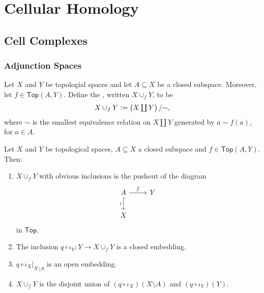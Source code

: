 \chapter{Cellular Homology}
\section*{Cell Complexes}
\subsection*{Adjunction Spaces}

\begin{definition}
	Let $X$ and $Y$ be topologial spaces and let $A \subseteq X$ be a closed subspace. Moreover, let $f \in \mathsf{Top}(A,Y)$. Define the , written $X \cup_f Y$, to be
	\begin{equation*}
		X \cup_f Y := \textstyle\del[1]{X \coprod Y}/{\sim},
	\end{equation*}
	\noindent where $\sim$ is the smallest equivalence relation on $X \coprod Y$ generated by $a {\sim} f(a)$, for $a \in A$.
\end{definition}

\begin{lemma}
	Let $X$ and $Y$ be topological spaces, $A \subseteq X$ a closed subspace and $f \in \mathsf{Top}(A,Y)$. Then:
	\begin{enumerate}[label = \textup{(}\alph*\textup{)}]
		\item $X \cup_f Y$ with obvious inclusions is the pushout of the diagram
			\begin{equation*}
				\begin{tikzcd}
					A \arrow[d,hook,"\iota"']\arrow[r,"f"] & Y\\
					X
				\end{tikzcd}
			\end{equation*}
			\noindent in $\mathsf{Top}$.
		\item The inclusion $q \circ \iota_Y : Y \to X \cup_f Y$ is a closed embedding.
		\item $q \circ \iota_X\vert_{X \setminus A}$ is an open embedding.
		\item $X \cup_f Y$ is the disjoint union of $(q \circ \iota_X)(X \setminus A)$ and $(q \circ \iota_Y)(Y)$.
	\end{enumerate}
\end{lemma}

